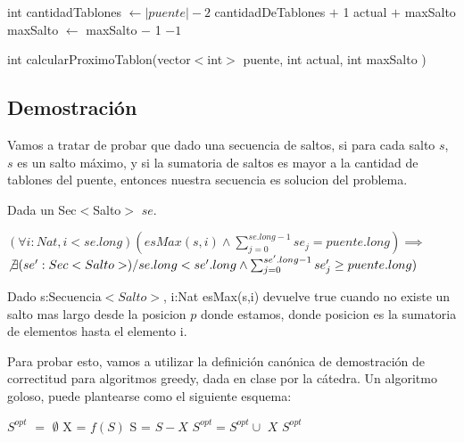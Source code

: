 \begin{algorithm}[H]
\begin{algorithmic}[1]
\STATE int cantidadTablones $\gets |puente| - 2$
        \RETURN cantidadDeTablones $+$ 1
    \ENDIF
        \RETURN actual $+$ maxSalto
    \ENDIF
    \STATE maxSalto $\gets$ maxSalto $-$ 1
\ENDWHILE
\RETURN $-1$
\caption{int calcularProximoTablon(vector$<$int$>$ puente, int actual, int maxSalto )}%
\end{algorithmic}
\end{algorithm}
\subsection{Demostraci\'on}

Vamos a tratar de probar que dado una secuencia de saltos, si para cada salto $s$, $s$ es un salto m\'aximo, y si la sumatoria de saltos es mayor a la cantidad de tablones del puente, entonces nuestra secuencia es solucion del problema.

Dada un Sec$<$Salto$>$ $se$.

$(\forall i:Nat, i < se.long)(esMax(s,i) \wedge \sum_{j=0}^{se.long-1}se_{j} = puente.long)\implies$ \\ $\not\exists (se':Sec<Salto>) /
se.long < se'.long \wedge \sum_{j=0}^{se'.long-1}se'_{j} \geq puente.long)$  

Dado s:Secuencia$<Salto>$, i:Nat esMax(s,i) devuelve true cuando no existe un salto mas largo desde la posicion $p$ donde estamos, donde posicion es la sumatoria de elementos hasta el elemento i.
 

Para probar esto, vamos a utilizar la definici\'on can\'onica de demostraci\'on de correctitud para algoritmos greedy, dada en clase por la c\'atedra. Un algoritmo goloso, puede plantearse como el siguiente esquema:

\begin{algorithm}
\begin{algorithmic}
\STATE $S^{opt}$ $=$ $\emptyset$
    \STATE X = $f(S)$
    \STATE S = $S - {X}$
    \STATE $S^{opt} = S^{opt} \cup$ ${X}$   
    \ENDIF         
\ENDWHILE
\RETURN $S^{opt}$
\end{algorithmic}
\end{algorithm}

